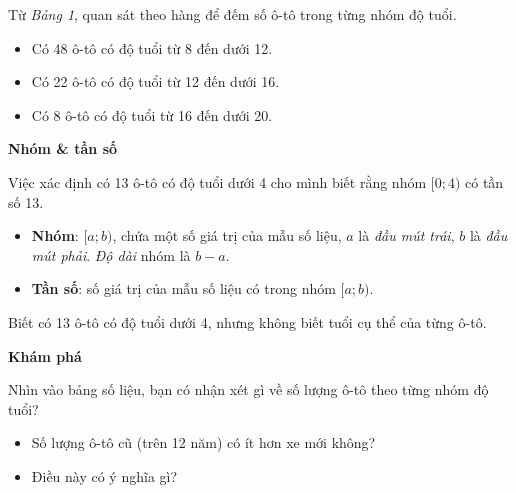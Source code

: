 \documentclass[
  letterpaper,
  DIV=11,
  numbers=noendperiod]{scrartcl}
\providecommand{\tightlist}{%
  \setlength{\itemsep}{0pt}\setlength{\parskip}{0pt}}\usepackage{longtable,booktabs,array}
\begin{document}
Từ \emph{Bảng 1}, quan sát theo hàng để đếm số ô-tô trong từng nhóm độ
tuổi.

\begin{itemize}
\tightlist
\item
  Có 48 ô-tô có độ tuổi từ 8 đến dưới 12.
\item
  Có 22 ô-tô có độ tuổi từ 12 đến dưới 16.
\item
  Có 8 ô-tô có độ tuổi từ 16 đến dưới 20.
\end{itemize}

\begin{tcolorbox}[enhanced jigsaw, toprule=.15mm, colback=white, bottomrule=.15mm, opacityback=0, leftrule=.75mm, rightrule=.15mm, colframe=quarto-callout-note-color-frame, arc=.35mm, breakable, left=2mm]

\vspace{-3mm}\textbf{Nhóm \& tần số}\vspace{3mm}

Việc xác định có 13 ô-tô có độ tuổi dưới 4 cho mình biết rằng nhóm
\([0;4)\) có tần số 13.

\begin{itemize}
\tightlist
\item
  \textbf{Nhóm}: \([a; b)\), chứa một số giá trị của mẫu số liệu, \(a\)
  là \emph{đầu mút trái}, \(b\) là \emph{đầu mút phải}. \emph{Độ dài}
  nhóm là \(b-a\).
\item
  \textbf{Tần số}: số giá trị của mẫu số liệu có trong nhóm \([a; b)\).
\end{itemize}

Biết có 13 ô-tô có độ tuổi dưới 4, nhưng không biết tuổi cụ thể của từng
ô-tô.

\end{tcolorbox}

\begin{tcolorbox}[enhanced jigsaw, toprule=.15mm, colback=white, bottomrule=.15mm, opacityback=0, leftrule=.75mm, rightrule=.15mm, colframe=quarto-callout-note-color-frame, arc=.35mm, breakable, left=2mm]

\vspace{-3mm}\textbf{Khám phá}\vspace{3mm}

Nhìn vào bảng số liệu, bạn có nhận xét gì về số lượng ô-tô theo từng
nhóm độ tuổi?

\begin{itemize}
\tightlist
\item
  Số lượng ô-tô cũ (trên 12 năm) có ít hơn xe mới không?
\item
  Điều này có ý nghĩa gì?
\end{itemize}

\end{tcolorbox}
\end{document}
